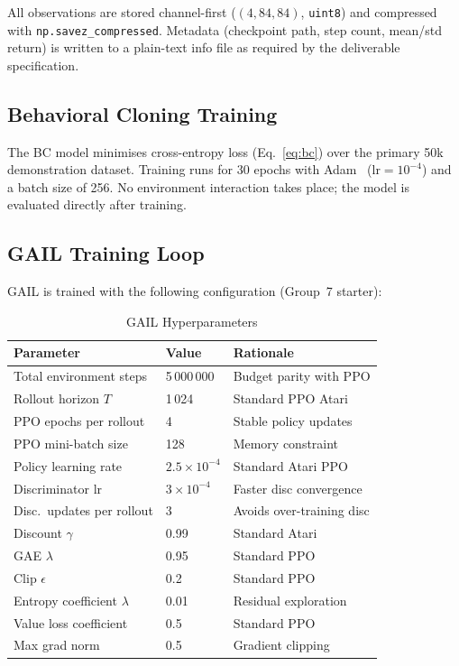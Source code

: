 \documentclass[conference]{IEEEtran}
\begin{document}
All observations are stored channel-first ($(4, 84, 84)$, \texttt{uint8}) and compressed
with \texttt{np.savez\_compressed}.
Metadata (checkpoint path, step count, mean/std return) is written to a plain-text info
file as required by the deliverable specification.

\subsection{Behavioral Cloning Training}

The BC model minimises cross-entropy loss (Eq.~\ref{eq:bc}) over the primary 50k
demonstration dataset.
Training runs for 30 epochs with Adam~\cite{kingma2015adam} ($\text{lr}=10^{-4}$) and a
batch size of 256.
No environment interaction takes place; the model is evaluated directly after training.

\subsection{GAIL Training Loop}

GAIL is trained with the following configuration (Group~7 starter):

\begin{table}[h]
\centering
\caption{GAIL Hyperparameters}
\label{tab:hyperparams}
\begin{tabular}{lll}
\toprule
\textbf{Parameter} & \textbf{Value} & \textbf{Rationale} \\
\midrule
Total environment steps      & 5\,000\,000  & Budget parity with PPO \\
Rollout horizon $T$          & 1\,024       & Standard PPO Atari \\
PPO epochs per rollout       & 4            & Stable policy updates \\
PPO mini-batch size          & 128          & Memory constraint \\
Policy learning rate         & $2.5\times10^{-4}$ & Standard Atari PPO \\
Discriminator lr             & $3\times10^{-4}$   & Faster disc convergence \\
Disc.\ updates per rollout   & 3            & Avoids over-training disc \\
Discount $\gamma$            & 0.99         & Standard Atari \\
GAE $\lambda$                & 0.95         & Standard PPO \\
Clip $\epsilon$              & 0.2          & Standard PPO \\
Entropy coefficient $\lambda$& 0.01         & Residual exploration \\
Value loss coefficient       & 0.5          & Standard PPO \\
Max grad norm                & 0.5          & Gradient clipping \\
\bottomrule
\end{tabular}
\end{table}
\end{document}
